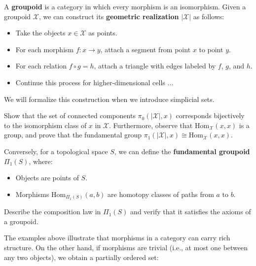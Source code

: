\begin{example}[Groupoid]
A \textbf{groupoid} is a category in which every morphism is an isomorphism. Given a groupoid $\mathcal{X}$, we can construct its \textbf{geometric realization} $|\mathcal{X}|$ as follows:
\begin{itemize}
    \item Take the objects $x \in \mathcal{X}$ as points.
    \item For each morphism $f: x \to y$, attach a segment from point $x$ to point $y$.
    \item For each relation $f \circ g = h$, attach a triangle with edges labeled by $f$, $g$, and $h$.
    \item Continue this process for higher-dimensional cells $\ldots$
\end{itemize}
We will formalize this construction when we introduce simplicial sets.

\begin{exercise}
Show that the set of connected components $\pi_0(|\mathcal{X}|, x)$ corresponds bijectively to the isomorphism class of $x$ in $\mathcal{X}$. Furthermore, observe that $\mathrm{Hom}_{\mathcal{X}}(x, x)$ is a group, and prove that the fundamental group $\pi_1(|\mathcal{X}|, x) \cong \mathrm{Hom}_{\mathcal{X}}(x, x)$.
\end{exercise}

Conversely, for a topological space $S$, we can define the \textbf{fundamental groupoid} $\Pi_1(S)$, where:
\begin{itemize}
    \item Objects are points of $S$.
    \item Morphisms $\mathrm{Hom}_{\Pi_1(S)}(a, b)$ are homotopy classes of paths from $a$ to $b$.
\end{itemize}

\begin{exercise}
Describe the composition law in $\Pi_1(S)$ and verify that it satisfies the axioms of a groupoid.
\end{exercise}
\end{example}

The examples above illustrate that morphisms in a category can carry rich structure. On the other hand, if morphisms are trivial (i.e., at most one between any two objects), we obtain a partially ordered set:

